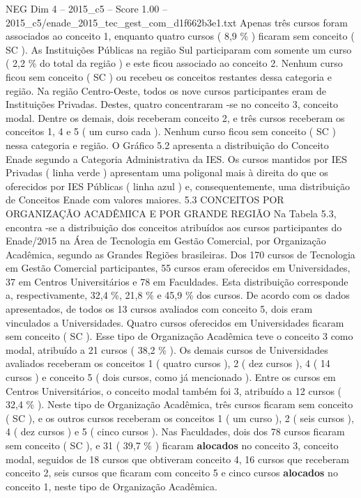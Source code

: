 \begin{textsample}{NEG Dim 4 – 2015\_c5 – Score 1.00 – 2015\_c5/enade\_2015\_tec\_gest\_com\_d1f662b3e1.txt}
Apenas três cursos foram associados ao conceito 1, enquanto quatro cursos ( 8,9 \% ) ficaram sem conceito ( SC ).
As Instituições Públicas na região Sul participaram com somente um curso ( 2,2 \% do total da região ) e este ficou associado ao conceito 2.
Nenhum curso ficou sem conceito ( SC ) ou recebeu os conceitos restantes dessa categoria e região.
Na região Centro-Oeste, todos os nove cursos participantes eram de Instituições Privadas.
Destes, quatro concentraram -se no conceito 3, conceito modal.
Dentre os demais, dois receberam conceito 2, e três cursos receberam os conceitos 1, 4 e 5 ( um curso cada ).
Nenhum curso ficou sem conceito ( SC ) nessa categoria e região.
O Gráfico 5.2 apresenta a distribuição do Conceito Enade segundo a Categoria Administrativa da IES.
Os cursos mantidos por IES Privadas ( linha verde ) apresentam uma poligonal mais à direita do que os oferecidos por IES Públicas ( linha azul ) e, consequentemente, uma distribuição de Conceitos Enade com valores maiores. 5.3 CONCEITOS POR ORGANIZAÇÃO ACADÊMICA E POR GRANDE REGIÃO Na Tabela 5.3, encontra -se a distribuição dos conceitos atribuídos aos cursos participantes do Enade/2015 na Área de Tecnologia em Gestão Comercial, por Organização Acadêmica, segundo as Grandes Regiões brasileiras.
Dos 170 cursos de Tecnologia em Gestão Comercial participantes, 55 cursos eram oferecidos em Universidades, 37 em Centros Universitários e 78 em Faculdades.
Esta distribuição corresponde a, respectivamente, 32,4 \%, 21,8 \% e 45,9 \% dos cursos.
De acordo com os dados apresentados, de todos os 13 cursos avaliados com conceito 5, dois eram vinculados a Universidades.
Quatro cursos oferecidos em Universidades ficaram sem conceito ( SC ).
Esse tipo de Organização Acadêmica teve o conceito 3 como modal, atribuído a 21 cursos ( 38,2 \% ).
Os demais cursos de Universidades avaliados receberam os conceitos 1 ( quatro cursos ), 2 ( dez cursos ), 4 ( 14 cursos ) e conceito 5 ( dois cursos, como já mencionado ).
Entre os cursos em Centros Universitários, o conceito modal também foi 3, atribuído a 12 cursos ( 32,4 \% ).
Neste tipo de Organização Acadêmica, três cursos ficaram sem conceito ( SC ), e os outros cursos receberam os conceitos 1 ( um curso ), 2 ( seis cursos ), 4 ( dez cursos ) e 5 ( cinco cursos ).
Nas Faculdades, dois dos 78 cursos ficaram sem conceito ( SC ), e 31 ( 39,7 \% ) ficaram \textbf{alocados} no conceito 3, conceito modal, seguidos de 18 cursos que obtiveram conceito 4, 16 cursos que receberam conceito 2, seis cursos que ficaram com conceito 5 e cinco cursos \textbf{alocados} no conceito 1, neste tipo de Organização Acadêmica.

\end{textsample}
